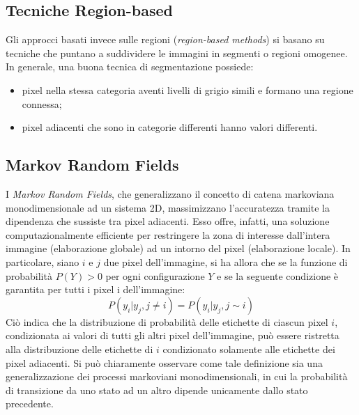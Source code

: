 \subsection{Tecniche Region-based}
Gli approcci basati invece sulle regioni (\emph{region-based methods}) si basano su tecniche che puntano a suddividere le immagini in segmenti o regioni omogenee. In generale, una buona tecnica di segmentazione possiede:
\begin{itemize}
\item pixel nella stessa categoria aventi livelli di grigio simili e formano una regione connessa;
\item pixel adiacenti che sono in categorie differenti hanno valori differenti. 
\end{itemize}


\subsection{Markov Random Fields}
I \emph{Markov Random Fields}, che generalizzano il concetto di catena markoviana monodimensionale ad un sistema 2D, massimizzano l'accuratezza tramite la dipendenza che sussiste tra pixel adiacenti. 
Esso offre, infatti, una soluzione computazionalmente efficiente per restringere la zona di interesse dall'intera immagine (elaborazione globale) ad un intorno del pixel (elaborazione locale). 
In particolare, siano $i$ e $j$ due pixel dell'immagine, si ha allora che se la funzione di probabilità $P(Y)>0$ per ogni configurazione $Y$ e se la seguente condizione è garantita per tutti i pixel i dell'immagine:
\begin{equation}
P(y_i|y_j, j \neq i) = P(y_i|y_j, j\sim i)
\end{equation}   
Ciò indica che la distribuzione di probabilità delle etichette di ciascun pixel $i$, condizionata ai valori di tutti gli altri pixel dell'immagine, può essere ristretta alla distribuzione delle etichette di $i$ condizionato solamente alle etichette dei pixel adiacenti. Si può chiaramente osservare come tale definizione sia una generalizzazione dei processi markoviani monodimensionali, in cui la probabilità di transizione da uno stato ad un altro dipende unicamente dallo stato precedente.
    

